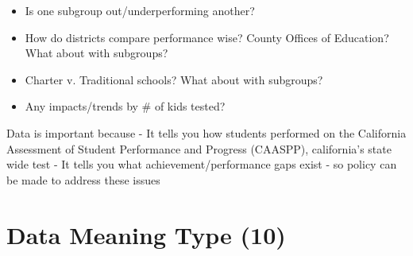 \documentclass[11pt]{article}
\providecommand{\tightlist}{%
      \setlength{\itemsep}{0pt}\setlength{\parskip}{0pt}}
\begin{document}
\begin{itemize}
\tightlist
\item
  Is one subgroup out/underperforming another?
\item
  How do districts compare performance wise? County Offices of
  Education? What about with subgroups?
\item
  Charter v. Traditional schools? What about with subgroups?
\item
  Any impacts/trends by \# of kids tested?
\end{itemize}

Data is important because - It tells you how students performed on the
California Assessment of Student Performance and Progress (CAASPP),
california's state wide test - It tells you what achievement/performance
gaps exist - so policy can be made to address these issues

    \section{Data Meaning Type (10)}\label{data-meaning-type-10}
\end{document}
